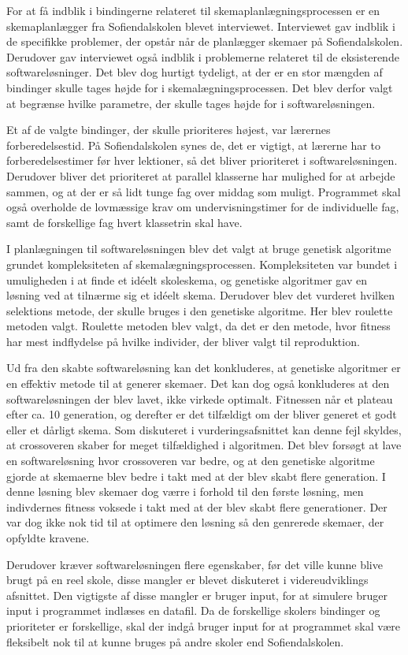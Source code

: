 For at få indblik i bindingerne relateret til skemaplanlægningsprocessen er en skemaplanlægger fra Sofiendalskolen blevet interviewet. Interviewet gav indblik i de specifikke problemer, der opstår når de planlægger skemaer på Sofiendalskolen. Derudover gav interviewet også indblik i problemerne relateret til de eksisterende softwareløsninger. Det blev dog hurtigt tydeligt, at der er en stor mængden af bindinger skulle tages højde for i skemalægningsprocessen. Det blev derfor valgt at begrænse hvilke parametre, der skulle tages højde for i softwareløsningen. 

Et af de valgte bindinger, der skulle prioriteres højest, var lærernes forberedelsestid. På Sofiendalskolen synes de, det er vigtigt, at lærerne har to forberedelsestimer før hver lektioner, så det bliver prioriteret i softwareløsningen. Derudover bliver det prioriteret at parallel klasserne har mulighed for at arbejde sammen, og at der er så lidt tunge fag over middag som muligt. Programmet skal også overholde de lovmæssige krav om undervisningstimer for de individuelle fag, samt de forskellige fag hvert klassetrin skal have. 

I planlægningen til softwareløsningen blev det valgt at bruge genetisk algoritme grundet kompleksiteten af skemalægningsprocessen. Kompleksiteten var bundet i umuligheden i at finde et idéelt skoleskema, og genetiske algoritmer gav en løsning ved at tilnærme sig et idéelt skema. Derudover blev det vurderet hvilken selektions metode, der skulle bruges i den genetiske algoritme. Her blev roulette metoden valgt. Roulette metoden blev valgt, da det er den metode, hvor fitness har mest indflydelse på hvilke individer, der bliver valgt til reproduktion. 

Ud fra den skabte softwareløsning kan det konkluderes, at genetiske algoritmer er en effektiv metode til at generer skemaer. Det kan dog også konkluderes at den softwareløsningen der blev lavet, ikke virkede optimalt. Fitnessen når et plateau efter ca. 10 generation, og derefter er det tilfældigt om der bliver generet et godt eller et dårligt skema. Som diskuteret i vurderingsafsnittet kan denne fejl skyldes, at crossoveren skaber for meget tilfældighed i algoritmen. Det blev forsøgt at lave en softwareløsning hvor crossoveren var bedre, og at den genetiske algoritme gjorde at skemaerne blev bedre i takt med at der blev skabt flere generation. I denne løsning blev skemaer dog værre i forhold til den første løsning, men indivdernes fitness voksede i takt med at der blev skabt flere generationer. Der var dog ikke nok tid til at optimere den løsning så den genrerede skemaer, der opfyldte kravene. 

Derudover kræver softwareløsningen flere egenskaber, før det ville kunne blive brugt på en reel skole, disse mangler er blevet diskuteret i videreudviklings afsnittet. Den vigtigste af disse mangler er bruger input, for at simulere bruger input i programmet indlæses en datafil. Da de forskellige skolers bindinger og prioriteter er forskellige, skal der indgå bruger input for at programmet skal være fleksibelt nok til at kunne bruges på andre skoler end Sofiendalskolen.
